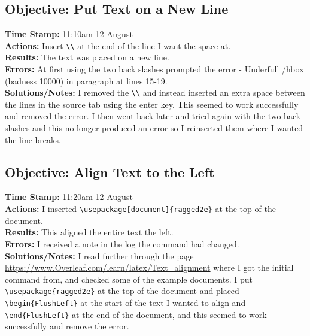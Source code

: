 \documentclass{article}
\begin{document}
\begin{FlushLeft}
\subsection{Objective: Put Text on a New Line}\label{sec:underfull}
\textbf{Time Stamp:} 11:10am  12 August\\
\textbf{Actions:} Insert \verb|\\| at the end of the line I want the space at.\\
\textbf{Results:} The text was placed on a new line.\\
\textbf{Errors:} At first using the two back slashes prompted the error - Underfull /hbox (badness 10000) in paragraph at lines 15-19.\\
\textbf{Solutions/Notes:} I removed the \verb|\\| and instead inserted an extra space between the lines in the source tab using the enter key. This seemed to work successfully and removed the error. I then went back later and tried again with the two back slashes and this no longer produced an error so I reinserted them where I wanted the line breaks.

\subsection{Objective: Align Text to the Left}\label{sec:logcommand}
\textbf{Time Stamp:} 11:20am 12 August\\
\textbf{Actions:} I inserted \verb|\usepackage[document]{ragged2e}| at the top of the document.\\
\textbf{Results:} This aligned the entire text the left.\\
\textbf{Errors:} I received a note in the log the command had changed. \\
\textbf{Solutions/Notes:} I read further through the page \url{https://www.Overleaf.com/learn/latex/Text_alignment} where I got the initial command from, and checked some of the example documents. I put \verb|\usepackage{ragged2e}| at the top of the document and placed \verb|\begin{FlushLeft}| at the start of the text I wanted to align and \verb|\end{FlushLeft}| at the end of the document, and this seemed to work successfully and remove the error.


\end{FlushLeft}
\end{document}
